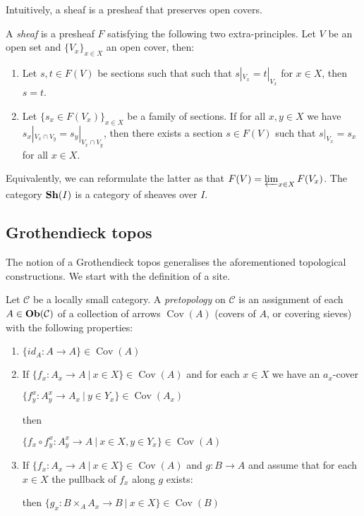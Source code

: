\documentclass[a4paper]{article}
\theoremstyle{defin}
\theoremstyle{theorem}
\theoremstyle{claim}
\theoremstyle{prop}
\theoremstyle{lemma}
\theoremstyle{fact}
\theoremstyle{ex}
\theoremstyle{col}
\begin{document}
Intuitively, a sheaf is a presheaf that preserves open covers.

A \emph{sheaf} is a presheaf $F$ satisfying the following two extra-principles. Let $V$ be an open set and $\{V_x
\}_{x \in X}$ an open cover, then:
\begin{enumerate}
\item Let $s, t \in F(V)$ be sections such that such that $s|_{V_x} = t|_{V_x}$ for $x \in X$, then $s = t$.
\item Let $\{ s_x \in F(V_x) \}_{x \in X}$ be a family of sections. If for all $x, y \in X$ we have $s_x|_{V_x \cap V_y} = s_y|_{V_x \cap V_y}$, then there exists a section $s \in F(V)$ such that $s|_{V_x} = s_x$ for all $x \in X$.
\end{enumerate}
Equivalently, we can reformulate the latter as that $F(V) = \varprojlim_{x \in X} F(V_x)$.
The category ${\bf Sh}(I)$ is a category of sheaves over $I$.

\subsection{Grothendieck topos}

The notion of a Grothendieck topos generalises the aforementioned topological constructions. We start with the definition of a site.

Let $\mathcal{C}$ be a locally small category. A \emph{pretopology} on $\mathcal{C}$ is an assignment of each $A \in {\bf Ob}(\mathcal{C})$ of a collection of arrows $\operatorname{Cov}(A)$ (covers of $A$, or covering sieves) with the following properties:
\begin{enumerate}
\item $\{ id_A : A \to A \} \in \operatorname{Cov}(A)$
\item If $\{ f_x : A_x \to A \: | \: x \in X \} \in \operatorname{Cov}(A)$ and for each $x \in X$ we have an $a_x$-cover
\begin{center}
$\{ f_y^x : A_y^x \to A_x \: | \: y \in Y_x \} \in \operatorname{Cov}(A_x)$
\end{center}
then
\begin{center}
$\{ f_x \circ f_y^x : A^x_y \to A \: | \: x \in X, y \in Y_x\} \in  \operatorname{Cov}(A)$
\end{center}
\item If $\{ f_x : A_x \to A \: | \: x \in X \} \in \operatorname{Cov}(A)$ and $g : B \to A$ and assume that for each $x \in X$ the pullback of $f_x$ along $g$ exists:

then $\{ g_x : B \times_A A_x \to B \:| \: x \in X\} \in \operatorname{Cov}(B)$
\end{enumerate}
\end{document}

